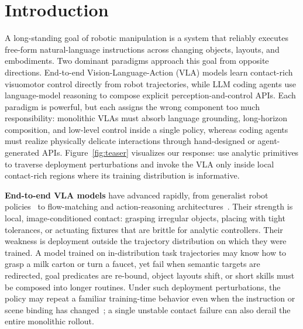 \documentclass[11pt]{article}
\begin{document}
\section{Introduction}
\label{sec:intro}


    A long-standing goal of robotic manipulation is a system that reliably executes free-form natural-language instructions across changing objects, layouts, and embodiments. Two dominant paradigms approach this goal from opposite directions. End-to-end Vision-Language-Action (VLA) models learn contact-rich visuomotor control directly from robot trajectories, while LLM coding agents use language-model reasoning to compose explicit perception-and-control APIs. Each paradigm is powerful, but each assigns the wrong component too much responsibility: monolithic VLAs must absorb language grounding, long-horizon composition, and low-level control inside a single policy, whereas coding agents must realize physically delicate interactions through hand-designed or agent-generated APIs. Figure~\ref{fig:teaser} visualizes our response: use analytic primitives to traverse deployment perturbations and invoke the VLA only inside local contact-rich regions where its training distribution is informative.

    \textbf{End-to-end VLA models} have advanced rapidly, from generalist robot policies~\citep{brohan2023rt2, kim2024openvla} to flow-matching and action-reasoning architectures~\citep{black2025pi0, black2025pi05, hung2025nora, molmoact2025}. Their strength is local, image-conditioned contact: grasping irregular objects, placing with tight tolerances, or actuating fixtures that are brittle for analytic controllers. Their weakness is deployment outside the trajectory distribution on which they were trained. A model trained on in-distribution task trajectories may know how to grasp a milk carton or turn a faucet, yet fail when semantic targets are redirected, goal predicates are re-bound, object layouts shift, or short skills must be composed into longer routines. Under such deployment perturbations, the policy may repeat a familiar training-time behavior even when the instruction or scene binding has changed~\citep{kim2024openvla, black2025pi05, pi0-experiment-wild}; a single unstable contact failure can also derail the entire monolithic rollout.
\end{document}
